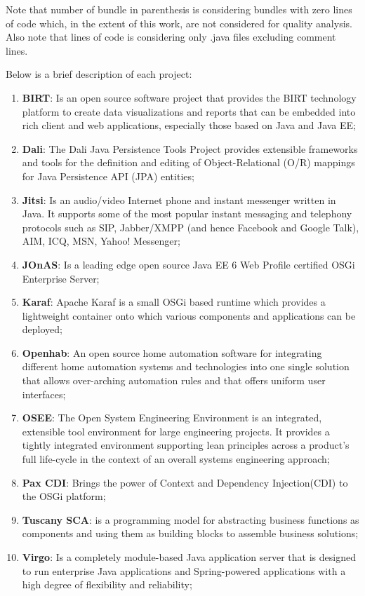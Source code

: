 Note that number of bundle in parenthesis is considering bundles with zero lines of code which, in the extent of this work, are not considered for quality analysis. Also note that lines of code is considering only .java files excluding comment lines.

Below is a brief description of each project:

\begin{enumerate}
\item \textbf{BIRT}: Is an open source software project that provides the BIRT technology platform to create data visualizations and reports that can be embedded into rich client and web applications, especially those based on Java and Java EE;
\item \textbf{Dali}: The Dali Java Persistence Tools Project provides extensible frameworks and tools for the definition and editing of Object-Relational (O/R) mappings for Java Persistence API (JPA) entities;
\item \textbf{Jitsi}: Is an audio/video Internet phone and instant messenger written in Java. It supports some of the most popular instant messaging and telephony protocols such as SIP, Jabber/XMPP (and hence Facebook and Google Talk), AIM, ICQ, MSN, Yahoo! Messenger;
\item \textbf{JOnAS}: Is a leading edge open source Java EE 6 Web Profile certified OSGi Enterprise Server;
\item \textbf{Karaf}: Apache Karaf is a small OSGi based runtime which provides a lightweight container onto which various components and applications can be deployed;
\item \textbf{Openhab}: An open source home automation software for integrating different home automation systems and technologies into one single solution that allows over-arching automation rules and that offers uniform user interfaces;
\item \textbf{OSEE}: The Open System Engineering Environment is an integrated, extensible tool environment for large engineering projects. It provides a tightly integrated environment supporting lean principles across a product's full life-cycle in the context of an overall systems engineering approach;
\item \textbf{Pax CDI}: Brings the power of Context and Dependency Injection(CDI) to the OSGi platform; 
\item \textbf{Tuscany SCA}: is a programming model for abstracting business functions as components and using them as building blocks to assemble business solutions; 
\item \textbf{Virgo}: Is a completely module-based Java application server that is designed to run enterprise Java applications and Spring-powered applications with a high degree of flexibility and reliability; 
\end{enumerate}



